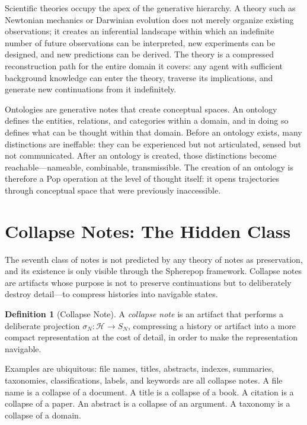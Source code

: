 \documentclass[12pt, a4paper]{article}
\theoremstyle{plain}
\theoremstyle{definition}
\newtheorem{definition}[theorem]{Definition}
\theoremstyle{remark}
\begin{document}
Scientific theories occupy the apex of the generative hierarchy. A theory such as
Newtonian mechanics or Darwinian evolution does not merely organize existing
observations; it creates an inferential landscape within which an indefinite number
of future observations can be interpreted, new experiments can be designed, and
new predictions can be derived. The theory is a compressed reconstruction path
for the entire domain it covers: any agent with sufficient background knowledge
can enter the theory, traverse its implications, and generate new continuations
from it indefinitely.

Ontologies are generative notes that create conceptual spaces. An ontology defines
the entities, relations, and categories within a domain, and in doing so defines
what can be thought within that domain. Before an ontology exists, many
distinctions are ineffable: they can be experienced but not articulated, sensed
but not communicated. After an ontology is created, those distinctions become
reachable---nameable, combinable, transmissible. The creation of an ontology is
therefore a Pop operation at the level of thought itself: it opens trajectories
through conceptual space that were previously inaccessible.

\section{Collapse Notes: The Hidden Class}

The seventh class of notes is not predicted by any theory of notes as
preservation, and its existence is only visible through the Spherepop framework.
Collapse notes are artifacts whose purpose is not to preserve continuations but to
deliberately destroy detail---to compress histories into navigable states.

\begin{definition}[Collapse Note]
A \emph{collapse note} is an artifact that performs a deliberate projection
$\sigma_N : \mathcal{H} \to S_N$, compressing a history or artifact into a more
compact representation at the cost of detail, in order to make the representation
navigable.
\end{definition}

Examples are ubiquitous: file names, titles, abstracts, indexes, summaries,
taxonomies, classifications, labels, and keywords are all collapse notes. A file
name is a collapse of a document. A title is a collapse of a book. A citation is
a collapse of a paper. An abstract is a collapse of an argument. A taxonomy is a
collapse of a domain.
\end{document}
